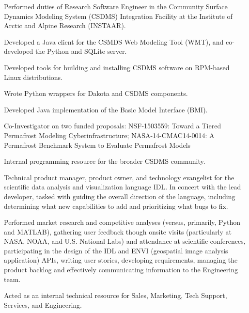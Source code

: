 \documentclass[letterpaper]{resume}
\begin{document}
\begin{compactitem}[\itembullet]
  \item Performed duties of Research Software Engineer in the
    Community Surface Dynamics Modeling System (CSDMS) Integration
    Facility at the Institute of Arctic and Alpine Research (INSTAAR).
  \item Developed a Java client for the CSMDS Web Modeling Tool (WMT),
    and co-developed the Python and SQLite server.
  \item Developed tools for building and installing CSDMS software on
    RPM-based Linux distributions.
  \item Wrote Python wrappers for Dakota and CSDMS components.
  \item Developed Java implementation of the Basic Model Interface (BMI).
  \item Co-Investigator on two funded proposals: NSF-1503559: Toward a
    Tiered Permafrost Modeling Cyberinfrastructure;
    NASA-14-CMAC14-0014: A Permafrost Benchmark System to Evaluate
    Permafrost Models
  \item Internal programming resource for the broader CSDMS community.
\end{compactitem}

\begin{compactitem}[\itembullet]
  \item Technical product manager, product owner, and technology
    evangelist for the scientific data analysis and visualization
    language IDL. In concert with the lead developer, tasked with
    guiding the overall direction of the language, including
    determining what new capabilities to add and prioritizing what
    bugs to fix.
  \item Performed market research and competitive analyses (versus,
    primarily, Python and MATLAB), gathering user feedback though
    onsite visits (particularly at NASA, NOAA, and U.S. National Labs)
    and attendance at scientific conferences, participating in the
    design of the IDL and ENVI (geospatial image analysis application)
    APIs, writing user stories, developing requirements, managing the
    product backlog and effectively communicating information to the
    Engineering team.
  \item Acted as an internal technical resource for Sales, Marketing,
    Tech Support, Services, and Engineering.
\end{compactitem}
\end{document}

